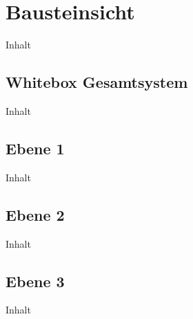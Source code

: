 \chapter{Bausteinsicht\label{chap5:Fuenftes-Kapitel}}

Inhalt

\section{Whitebox Gesamtsystem\label{sec5.1:Unterpunkt-1}}

Inhalt

\section{Ebene 1\label{sec5.2:Unterpunkt-2}}

Inhalt

\section{Ebene 2\label{sec5.3:Unterpunkt-3}}

Inhalt

\section{Ebene 3\label{sec5.4:Unterpunkt-4}}

Inhalt